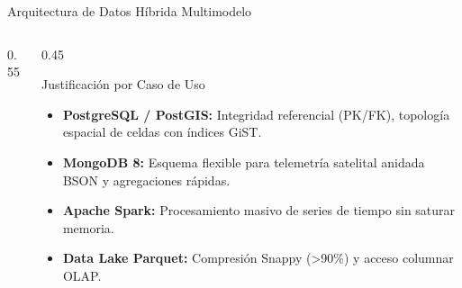 \documentclass[aspectratio=169,11pt]{beamer}
\begin{document}
\begin{frame}{Arquitectura de Datos H\'ibrida Multimodelo}
\begin{columns}
\begin{column}{0.55\textwidth}
    \end{column}
    \begin{column}{0.45\textwidth}
      \begin{block}{Justificaci\'on por Caso de Uso}\scriptsize
        \begin{itemize}
          \item \textbf{PostgreSQL / PostGIS:} Integridad referencial (PK/FK), topolog\'ia espacial de celdas con \'indices GiST.
          \item \textbf{MongoDB 8:} Esquema flexible para telemetr\'ia satelital anidada BSON y agregaciones r\'apidas.
          \item \textbf{Apache Spark:} Procesamiento masivo de series de tiempo sin saturar memoria.
          \item \textbf{Data Lake Parquet:} Compresi\'on Snappy (>90\%) y acceso columnar OLAP.
        \end{itemize}
      \end{block}
    \end{column}
  \end{columns}
\end{frame}
\end{document}
